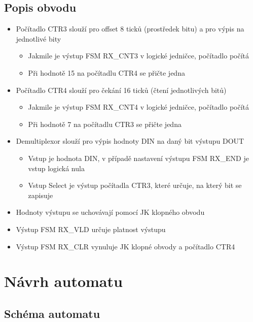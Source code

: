 \documentclass{article}
\begin{document}
	\subsection{Popis obvodu}
	\begin{itemize}
		\item Počítadlo CTR3 slouží pro offset 8 ticků (prostředek bitu) a pro výpis na
				jednotlivé bity
		\begin{itemize}
			\item Jakmile je výstup FSM RX\_CNT3 v logické jedničce,
					počítadlo počítá
			\item Při hodnotě 15 na počítadlu CTR4 se přičte jedna
		\end{itemize}

		\item Počítadlo CTR4 slouží pro čekání 16 ticků (čtení jednotlivých bitů)
		\begin{itemize}
			\item Jakmile je výstup FSM RX\_CNT4 v logické jedničce,
					počítadlo počítá
			\item Při hodnotě 7 na počítadlu CTR3 se přičte jedna
		\end{itemize}

		\item Demultiplexor slouží pro výpis hodnoty DIN na daný bit
				výstupu DOUT
		\begin{itemize}
			\item Vstup je hodnota DIN, v případě nastavení výstupu FSM
					RX\_END je vstup logická nula
			\item Vstup Select je výstup počítadla CTR3, které určuje, na
					který bit se zapisuje
		\end{itemize}

		\item Hodnoty výstupu se uchovávají pomocí JK klopného obvodu
		\item Výstup FSM RX\_VLD určuje platnost výstupu
		\item Výstup FSM RX\_CLR vynuluje JK klopné obvody a počítadlo CTR4
	\end{itemize}

	\newpage

	\section{Návrh automatu}

	\subsection{Schéma automatu}
\end{document}
